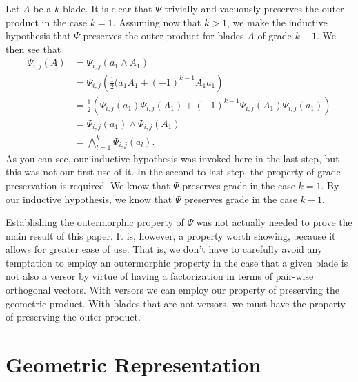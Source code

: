 \documentclass{ecgd-l}
\theoremstyle{definition}
\theoremstyle{remark}
\numberwithin{equation}{section}
\begin{document}
Let $A$ be a $k$-blade.  It is clear that $\Psi$ trivially and vacuously preserves the
outer product in the case $k=1$.  Assuming now that $k>1$, we make the
inductive hypothesis that $\Psi$ preserves the outer product for blades $A$
of grade $k-1$.  We then see that
\begin{align*}
\Psi_{i,j}(A) &= \Psi_{i,j}(a_1\wedge A_1) \\
 &= \Psi_{i,j}\left(\frac{1}{2}(a_1A_1+(-1)^{k-1}A_1a_1\right) \\
 &= \frac{1}{2}\left(\Psi_{i,j}(a_1)\Psi_{i,j}(A_1)+(-1)^{k-1}\Psi_{i,j}(A_1)\Psi_{i,j}(a_1)\right) \\
 &= \Psi_{i,j}(a_1)\wedge\Psi_{i,j}(A_1) \\
 &= \bigwedge_{l=1}^k\Psi_{i,j}(a_l).
\end{align*}
As you can see, our inductive hypothesis was invoked here in the last step, but
this was not our first use of it.
In the second-to-last step, the property of grade preservation is required.
We know that $\Psi$ preserves grade in the case $k=1$.  By our inductive
hypothesis, we know that $\Psi$ preserves grade in the case $k-1$.

Establishing the outermorphic property of $\Psi$ was not actually needed
to prove the main result of this paper.  It is, however, a property worth showing,
because it allows for greater ease of use.  That is, we don't have to carefully avoid
any temptation to employ an outermorphic property in the case that a given blade
is not also a versor by virtue of having a factorization in terms of pair-wise
orthogonal vectors.  With versors we can employ our property of preserving
the geometric product.  With blades that are not versors, we must have the
property of preserving the outer product.

\section{Geometric Representation}
\end{document}

